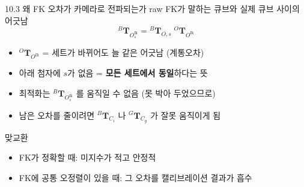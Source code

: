 \documentclass[aspectratio=169,11pt]{beamer}
\newcommand{\T}[3][]{{}^{#2}\mathbf{T}^{#1}_{#3}}   %
\newcommand{\Ofk}{O^{\mathrm{fk}}}     %
\begin{document}
\begin{frame}{10.3 왜 FK 오차가 카메라로 전파되는가}
  raw FK가 말하는 큐브와 실제 큐브 사이의 어긋남
  \[
    \T{B}{\Ofk_s}
    =
    \T{B}{O,s}\;\T{O}{\Ofk}
  \]
  \begin{itemize}
    \item $\T{O}{\Ofk}$ = 세트가 바뀌어도 늘 같은 어긋남 (계통오차)
    \item 아래 첨자에 $s$가 없음 = \textbf{모든 세트에서 동일}하다는 뜻
  \end{itemize}
  \vfill
  \begin{itemize}
    \item 최적화는 $\T{B}{\Ofk_s}$ 를 움직일 수 없음 (못 박아 두었으므로)
    \item 남은 오차를 줄이려면 $\T{B}{C_i}$ 나 $\T{G}{C_g}$ 가 잘못 움직이게 됨
  \end{itemize}
  \vfill
  \begin{alertblock}{맞교환}
    \begin{itemize}
      \item FK가 정확할 때: 미지수가 적고 안정적
      \item FK에 공통 오정렬이 있을 때: 그 오차를 캘리브레이션 결과가 흡수
    \end{itemize}
  \end{alertblock}
\end{frame}
\end{document}
